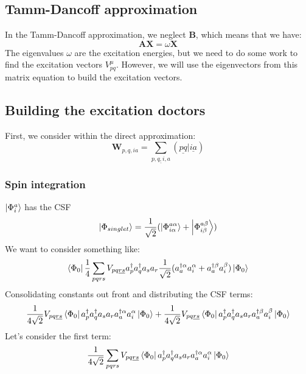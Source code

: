 \documentclass[12pt]{article}
\begin{document}
\subsection{Tamm-Dancoff approximation}
In the Tamm-Dancoff approximation, we neglect $\textbf{B}$, which means that we have:
\begin{equation}
    \textbf{A}\textbf{X} = \omega \textbf{X}
\end{equation}
The eigenvalues $\omega $ are the excitation energies, but we need to do some work to find the excitation vectors $V_{pq}^{\mu }$. However, we will use the eigenvectors from this matrix equation to build the excitation vectors.
\subsection{Building the excitation doctors}
First, we consider within the direct approximation:
\begin{equation}
    \textbf{W}_{p,q,ia} = \sum_{\underline{p,q,i,a}} (\underline{pq}|\underline{ia}) 
\end{equation}
\subsubsection{Spin integration}
$\ket{\Phi  _i^a}$ has the CSF
\begin{equation}
    \ket{\Phi  _{singlet}} = \frac{1}{\sqrt{2}}(\ket{\Phi _{i\alpha }^{a\alpha  }} + \ket{\Phi _{i\beta }^{a\beta  }})
\end{equation}
We want to consider something like:
\begin{equation}
\bra{\Phi _0}
    \frac{1}{4}\sum_{pqrs} V_{pq\underline{rs}}a^{\dag}_{p}a^{\dag}_{q}a_{s}a_{r}\frac{1}{\sqrt{2}}(a^{\dag \alpha }_{a}a^{\alpha }_{i} + a^{\dag \beta }_{a}a^{\beta }_{i})\ket{\Phi _0}
\end{equation}
Consolidating constants out front and distributing the CSF terms:
\begin{equation}
    \frac{1}{4\sqrt{2}}V_{pq\underline{rs}}\bra{\Phi _0}a^{\dag}_{p}a^{\dag}_{q}a_{s}a_{r}a^{\dag \alpha }_{a}a^{\alpha }_{i}\ket{\Phi _0} + \frac{1}{4\sqrt{2}}V_{pq\underline{rs}}\bra{\Phi _0}a^{\dag}_{p}a^{\dag}_{q}a_{s}a_{r}a^{\dag \beta }_{a}a^{\beta }_{i}\ket{\Phi _0}
\end{equation}
Let's consider the first term:
\begin{equation}
    \frac{1}{4\sqrt{2}}\sum_{pqrs} V_{pq\underline{rs}}\bra{\Phi _0}a^{\dag}_{p}a^{\dag}_{q}a_{s}a_{r}a^{\dag \alpha }_{a}a^{\alpha }_{i}\ket{\Phi _0}
\end{equation}
\end{document}
